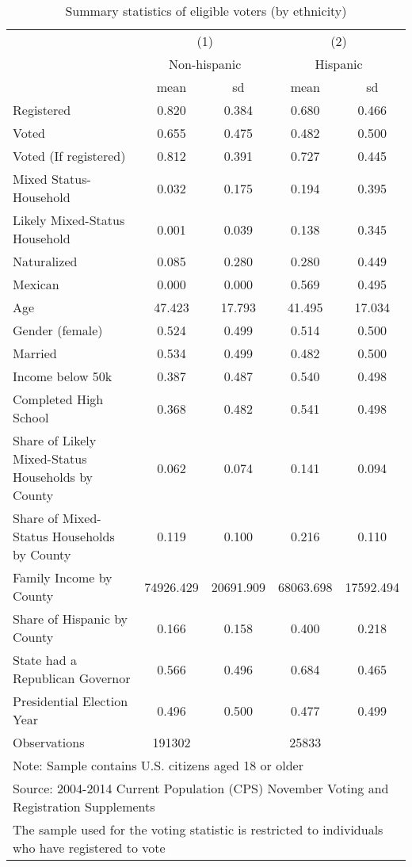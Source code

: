 \begin{table}[htbp]\centering
\def\sym#1{\ifmmode^{#1}\else\(^{#1}\)\fi}
\caption{Summary statistics of eligible voters (by ethnicity)}
\begin{tabular}{l*{2}{cc}}
\toprule
                &\multicolumn{2}{c}{(1)}&\multicolumn{2}{c}{(2)}\\
                &\multicolumn{2}{c}{Non-hispanic}&\multicolumn{2}{c}{Hispanic}\\
                &     mean&       sd&     mean&       sd\\
\midrule
Registered      &    0.820&    0.384&    0.680&    0.466\\
Voted           &    0.655&    0.475&    0.482&    0.500\\
Voted (If registered)&    0.812&    0.391&    0.727&    0.445\\
Mixed Status-Household&    0.032&    0.175&    0.194&    0.395\\
Likely Mixed-Status Household&    0.001&    0.039&    0.138&    0.345\\
Naturalized     &    0.085&    0.280&    0.280&    0.449\\
Mexican         &    0.000&    0.000&    0.569&    0.495\\
Age             &   47.423&   17.793&   41.495&   17.034\\
Gender (female) &    0.524&    0.499&    0.514&    0.500\\
Married         &    0.534&    0.499&    0.482&    0.500\\
Income below 50k&    0.387&    0.487&    0.540&    0.498\\
Completed High School&    0.368&    0.482&    0.541&    0.498\\
Share of Likely Mixed-Status Households by County&    0.062&    0.074&    0.141&    0.094\\
Share of Mixed-Status Households by County&    0.119&    0.100&    0.216&    0.110\\
Family Income by County&74926.429&20691.909&68063.698&17592.494\\
Share of Hispanic by County&    0.166&    0.158&    0.400&    0.218\\
State had a Republican Governor&    0.566&    0.496&    0.684&    0.465\\
Presidential Election Year&    0.496&    0.500&    0.477&    0.499\\
\midrule
Observations    &   191302&         &    25833&         \\
\bottomrule
\multicolumn{5}{l}{\footnotesize Note: Sample contains U.S. citizens aged 18 or older}\\
\multicolumn{5}{l}{\footnotesize Source: 2004-2014 Current Population (CPS) November Voting and Registration Supplements}\\
\multicolumn{5}{l}{\footnotesize The sample used for the voting statistic is restricted to individuals who have registered to vote}\\
\end{tabular}
\end{table}
